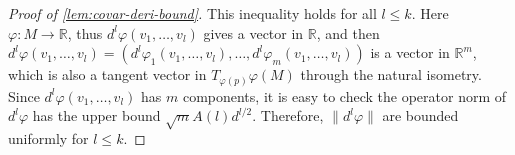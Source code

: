 \begin{proof}[Proof of \cref{lem:covar-deri-bound}]
This inequality holds for all $l \leq k$. Here $\varphi : M \rightarrow \mathbb{R}$, thus $d^l \varphi (v_1,\dots,v_l)$ gives a vector in $\mathbb{R}$, and then $d^l \varphi (v_1,\dots,v_l) = \left(d^l\varphi_1(v_1,\dots,v_l),\dots,d^l\varphi_m (v_1,\dots,v_l)\right)$ is a vector in $\mathbb{R}^m$, which is also a tangent vector in $T_{\varphi(p)}\varphi(M)$ through the natural isometry. Since $d^l \varphi(v_1,\dots,v_l)$ has $m$ components, it is easy to check the operator norm of $d^l \varphi$ has the upper bound $\sqrt{m}A(l)d^{l/2}$. Therefore, $\|d^l \varphi\|$ are bounded uniformly for $l \leq k$.
\end{proof}